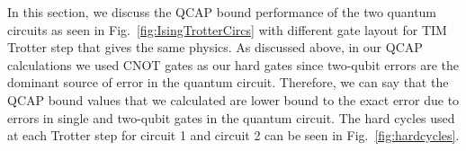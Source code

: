 In this section, we discuss the QCAP bound performance of the two quantum circuits as seen in Fig.~\ref{fig:IsingTrotterCircs} with different gate layout for TIM Trotter step that gives the same physics. As discussed above, in our QCAP calculations we used CNOT gates as our hard gates since two-qubit errors are the dominant source of error in the quantum circuit. Therefore, we can say that the QCAP bound values that we calculated are lower bound to the exact error due to errors in single and two-qubit gates in the quantum circuit. The hard cycles used at each Trotter step for circuit 1 and circuit 2 can be seen in Fig.~\ref{fig:hardcycles}.  



